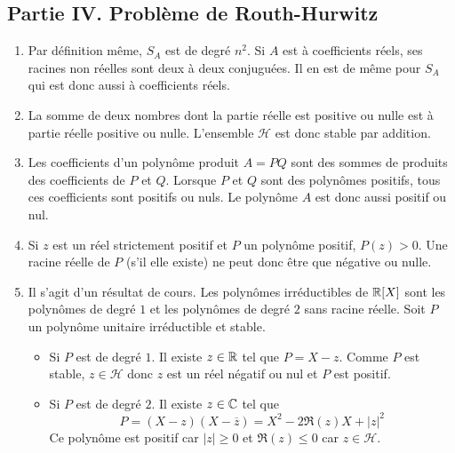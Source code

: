 \subsection*{Partie IV. Problème de Routh-Hurwitz}
\begin{enumerate}
\item Par définition même, $S_A$ est de degré $n^2$. Si $A$ est à coefficients réels, ses racines non réelles sont deux à deux conjuguées. Il en est de même pour $S_A$ qui est donc aussi à coefficients réels. 
\item La somme de deux nombres dont la partie réelle est positive ou nulle est à partie réelle positive ou nulle. L'ensemble $\mathcal H$ est donc stable par addition.
\item Les coefficients d'un polynôme produit $A=PQ$ sont des sommes de produits des coefficients de $P$ et $Q$. Lorsque $P$ et $Q$ sont des polynômes positifs, tous ces coefficients sont positifs ou nuls. Le polynôme $A$ est donc aussi positif ou nul. 
\item Si $z$ est un réel strictement positif et $P$ un polynôme positif, $P(z)>0$. Une racine réelle de $P$ (s'il elle existe) ne peut donc être que négative ou nulle.
\item Il s'agit d'un résultat de cours. Les polynômes irréductibles de $\mathbb{R}[X]$ sont les polynômes de degré $1$ et les polynômes de degré $2$ sans racine réelle.\newline
Soit $P$ un polynôme unitaire irréductible et stable.
\begin{itemize}
 \item Si $P$ est de degré $1$. Il existe $z\in \mathbb{R}$ tel que $P=X-z$. Comme $P$ est stable, $z\in \mathcal H$ donc $z$ est un réel négatif ou nul et $P$ est positif.
\item Si $P$ est de degré $2$. Il existe $z\in \mathbb{C}$ tel que 
\begin{displaymath}
 P=(X-z)(X-\overline{z})=X^2 - 2\Re (z)X +|z|^2
\end{displaymath}
Ce polynôme est positif car $|z|\geq 0$ et $\Re(z)\leq 0$ car $z\in \mathcal H$.
\end{itemize}


\end{enumerate}
